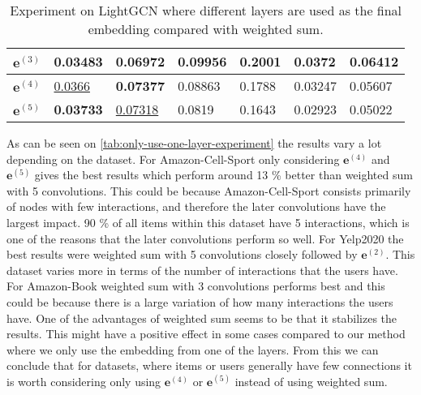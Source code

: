 \begin{table*}[]
\begin{tabular}{|l|l|l|l|l|l|l|}
        $\mathbf{e}^{(3)}$   & 0.03483                                & 0.06972                       & 0.09956                          & 0.2001            & 0.0372              & 0.06412             \\ \hline
        $\mathbf{e}^{(4)}$   & \underline{0.0366}                     & \textbf{0.07377}              & 0.08863                          & 0.1788            & 0.03247             & 0.05607             \\ \hline
        $\mathbf{e}^{(5)}$   & \textbf{0.03733}                       & \underline{0.07318}           & 0.0819                           & 0.1643            & 0.02923             & 0.05022             \\ \hline
    \end{tabular}
    \centering
    \caption{Experiment on LightGCN where different layers are used as the final embedding compared with weighted sum.}
    \label{tab:only-use-one-layer-experiment}
\end{table*}
As can be seen on \autoref{tab:only-use-one-layer-experiment} the results vary a lot depending on the dataset.
For Amazon-Cell-Sport only considering $\mathbf{e}^{(4)}$ and $\mathbf{e}^{(5)}$ gives the best results which perform around 13 \% better than weighted sum with 5 convolutions.
This could be because Amazon-Cell-Sport consists primarily of nodes with few interactions, and therefore the later convolutions have the largest impact.
90 \% of all items within this dataset have 5 interactions, which is one of the reasons that the later convolutions perform so well.
For Yelp2020 the best results were weighted sum with 5 convolutions closely followed by $\mathbf{e}^{(2)}$.
This dataset varies more in terms of the number of interactions that the users have.
For Amazon-Book weighted sum with 3 convolutions performs best and this could be because there is a large variation of how many interactions the users have.
One of the advantages of weighted sum seems to be that it stabilizes the results.
This might have a positive effect in some cases compared to our method where we only use the embedding from one of the layers.
From this we can conclude that for datasets, where items or users generally have few connections it is worth considering only using $\mathbf{e}^{(4)}$ or $\mathbf{e}^{(5)}$ instead of using weighted sum.

